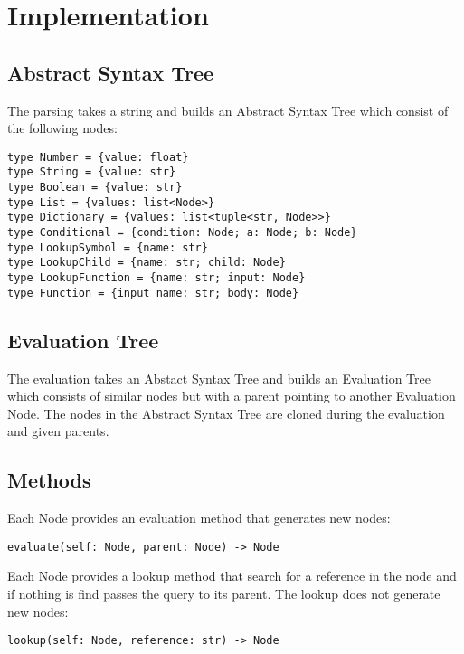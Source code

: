\documentclass[a4paper,12pt]{article}
\begin{document}
\section{Implementation}

\subsection{Abstract Syntax Tree}
The parsing takes a string and builds an Abstract Syntax Tree which consist of the following nodes:
\begin{verbatim}
type Number = {value: float}
type String = {value: str}
type Boolean = {value: str}
type List = {values: list<Node>}
type Dictionary = {values: list<tuple<str, Node>>}
type Conditional = {condition: Node; a: Node; b: Node}
type LookupSymbol = {name: str}
type LookupChild = {name: str; child: Node}
type LookupFunction = {name: str; input: Node}
type Function = {input_name: str; body: Node}
\end{verbatim}

\subsection{Evaluation Tree}

The evaluation takes an Abstact Syntax Tree and builds an Evaluation Tree which consists of similar nodes but with a parent pointing to another Evaluation Node. The nodes in the Abstract Syntax Tree are cloned during the evaluation and given parents.

\subsection{Methods}

Each Node provides an evaluation method that generates new nodes:
\begin{verbatim}
evaluate(self: Node, parent: Node) -> Node
\end{verbatim}
Each Node provides a lookup method that search for a reference in the node and if nothing is find passes the query to its parent. The lookup does not generate new nodes:
\begin{verbatim}
lookup(self: Node, reference: str) -> Node
\end{verbatim}
\end{document}
